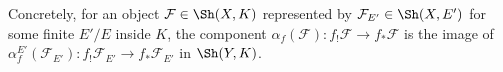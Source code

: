 \begin{definition}
Concretely, for an object $\mathcal{F} \in \Sh(X, K)$ represented by $\mathcal{F}_{E'} \in \Sh(X, E')$ for some finite $E'/E$ inside $K$, the component $\alpha_f(\mathcal{F}): f_! \mathcal{F} \to f_* \mathcal{F}$ is the image of $\alpha^{E'}_f(\mathcal{F}_{E'}): f_! \mathcal{F}_{E'} \to f_* \mathcal{F}_{E'}$ in $\Sh(Y, K)$.
\end{definition}
